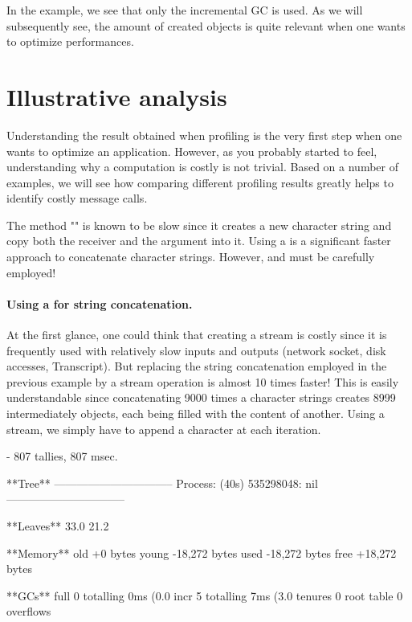 \documentclass[a4paper,10pt,twoside]{book}
\begin{document}
In the example, we see that only the incremental GC is used. As we will subsequently see, the amount of created objects is quite relevant when one wants to optimize performances.

\section{Illustrative analysis}

Understanding the result obtained when profiling is the very first step when one wants to optimize an application. However, as you probably started to feel, understanding why a computation is costly is not trivial. Based on a number of examples, we will see how comparing different profiling results greatly helps to identify costly message calls. 

The method "\ct{,}" is known to be slow since it creates a new character string and copy both the receiver and the argument into it. Using a  is a significant faster approach to concatenate character strings. However,  and  must be carefully employed!


\paragraph{Using a  for string concatenation.}
At the first glance, one could think that creating a stream is costly since it is frequently used with relatively slow inputs and outputs (\eg network socket, disk accesses, Transcript). But replacing the string concatenation employed in the previous example by a stream operation is almost 10 times faster! This is easily understandable since concatenating 9000 times a character strings creates 8999 intermediately objects, each being filled with the content of another. Using a stream, we simply have to append a character at each iteration.


\begin{code}{}

 - 807 tallies, 807 msec.

**Tree**
--------------------------------
Process: (40s)  535298048: nil
--------------------------------

**Leaves**
33.0%
21.2%

**Memory**
	old			+0 bytes
	young		-18,272 bytes
	used		-18,272 bytes
	free		+18,272 bytes

**GCs**
	full			0 totalling 0ms (0.0%
	incr		5 totalling 7ms (3.0%
	tenures		0
	root table	0 overflows
\end{code}
\end{document}
